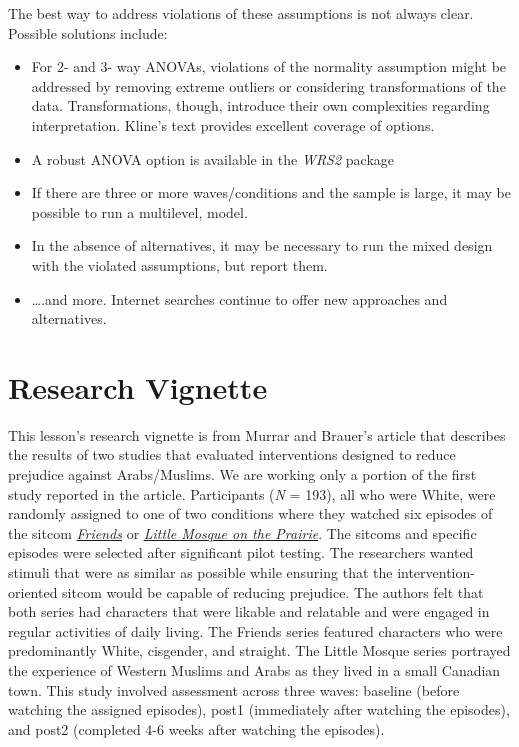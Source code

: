 \documentclass[
  11pt,
]{book}
\providecommand{\tightlist}{%
  \setlength{\itemsep}{0pt}\setlength{\parskip}{0pt}}
\begin{document}
The best way to address violations of these assumptions is not always clear. Possible solutions include:

\begin{itemize}
\tightlist
\item
  For 2- and 3- way ANOVAs, violations of the normality assumption might be addressed by removing extreme outliers or considering transformations of the data. Transformations, though, introduce their own complexities regarding interpretation. Kline's text \citep{kline_data_2016} provides excellent coverage of options.
\item
  A robust ANOVA option is available in the \emph{WRS2} package
\item
  If there are three or more waves/conditions and the sample is large, it may be possible to run a multilevel, model.
\item
  In the absence of alternatives, it may be necessary to run the mixed design with the violated assumptions, but report them.
\item
  \ldots.and more. Internet searches continue to offer new approaches and alternatives.
\end{itemize}

\hypertarget{research-vignette-7}{%
\section{Research Vignette}\label{research-vignette-7}}

This lesson's research vignette is from Murrar and Brauer's \citeyearpar{murrar_entertainment-education_2018} article that describes the results of two studies that evaluated interventions designed to reduce prejudice against Arabs/Muslims. We are working only a portion of the first study reported in the article. Participants (\emph{N} = 193), all who were White, were randomly assigned to one of two conditions where they watched six episodes of the sitcom \href{http://www.friends-tv.org/}{\emph{Friends}} or \href{https://en.wikipedia.org/wiki/Little_Mosque_on_the_Prairie}{\emph{Little Mosque on the Prairie}}. The sitcoms and specific episodes were selected after significant pilot testing. The researchers wanted stimuli that were as similar as possible while ensuring that the intervention-oriented sitcom would be capable of reducing prejudice. The authors felt that both series had characters that were likable and relatable and were engaged in regular activities of daily living. The Friends series featured characters who were predominantly White, cisgender, and straight. The Little Mosque series portrayed the experience of Western Muslims and Arabs as they lived in a small Canadian town. This study involved assessment across three waves: baseline (before watching the assigned episodes), post1 (immediately after watching the episodes), and post2 (completed 4-6 weeks after watching the episodes).
\end{document}
